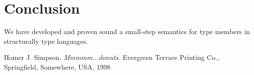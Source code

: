 \documentclass[a4paper,UKenglish]{lipics}
\begin{document}
\section{Conclusion}
We have developed and proven sound a small-step semantics for type members in structurally type languages.




%


\nocite{Simpson}

\begin{thebibliography}{50}
 Homer J. Simpson. \textsl{Mmmmm...donuts}. Evergreen Terrace Printing Co., Springfield, Somewhere, USA, 1998
\end{thebibliography}
\end{document}

